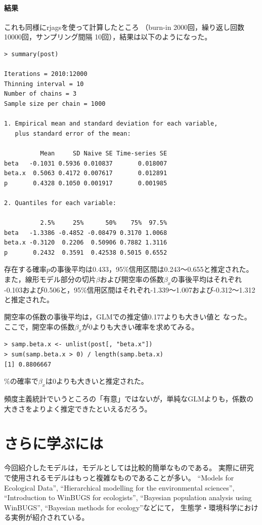 \documentclass[11pt,uplatex]{jsarticle}
\begin{document}
\paragraph{結果}
これも同様に\textsf{rjags}を使って計算したところ
（burn-in 2000回，繰り返し回数 10000回，サンプリング間隔 10回），結果は以下のようになった。

\begin{lstlisting}
> summary(post)

Iterations = 2010:12000
Thinning interval = 10 
Number of chains = 3 
Sample size per chain = 1000 

1. Empirical mean and standard deviation for each variable,
   plus standard error of the mean:

          Mean     SD Naive SE Time-series SE
beta   -0.1031 0.5936 0.010837       0.018007
beta.x  0.5063 0.4172 0.007617       0.012891
p       0.4328 0.1050 0.001917       0.001985

2. Quantiles for each variable:

          2.5%     25%      50%    75%  97.5%
beta   -1.3386 -0.4852 -0.08479 0.3170 1.0068
beta.x -0.3120  0.2206  0.50906 0.7882 1.3116
p       0.2432  0.3591  0.42538 0.5015 0.6552

\end{lstlisting}
存在する確率$p$の事後平均は0.433，95\%信用区間は0.243〜0.655と推定された。
また，線形モデル部分の切片$\beta$および開空率の係数$\beta_{x}$の事後平均はそれぞれ
-0.103および0.506と，95\%信用区間はそれぞれ-1.339〜1.007および-0.312〜1.312
と推定された。

開空率の係数の事後平均は，GLMでの推定値0.177よりも大きい値と
なった。
ここで，開空率の係数$\beta_{x}$が0よりも大きい確率を求めてみる。

\begin{lstlisting}
> samp.beta.x <- unlist(post[, "beta.x"])
> sum(samp.beta.x > 0) / length(samp.beta.x)
[1] 0.8806667
\end{lstlisting}

\%の確率で$\beta_{x}$は0よりも大きいと推定された。

頻度主義統計でいうところの「有意」ではないが，単純なGLMよりも，係数の大きさをよりよく推定できたといえるだろう。

\pagebreak

\section{さらに学ぶには}

今回紹介したモデルは，モデルとしては比較的簡単なものである。
実際に研究で使用されるモデルはもっと複雑なものであることが多い。
``Models for Ecological Data''\cite{Clark},
``Hierarchical modelling for the environmental sciences''\cite{Clark_Gelfand},
``Introduction to WinBUGS for ecologists''\cite{IWE},
``Bayesian population analysis using WinBUGS''\cite{BPA},
``Bayesian methods for ecology''\cite{McCarthy}などにて，
生態学・環境科学における実例が紹介されている。
\end{document}
